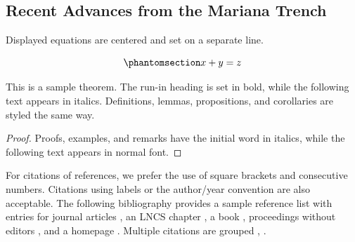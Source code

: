 \documentclass[
  runningheads]{llncs}
\begin{document}
\begin{table}[t]

\caption{\label{tbl-headings}Table captions should be placed above the
tables.}


\end{table}%

\subsection{Recent Advances from the Mariana
Trench}\label{recent-advances-from-the-mariana-trench}

Displayed equations are centered and set on a separate line.

\begin{equation}\phantomsection\label{eq-linear}{
x + y = z
}\end{equation}

\begin{theorem}
This is a sample theorem. The run-in heading is set in bold, while
the following text appears in italics. Definitions, lemmas,
propositions, and corollaries are styled the same way.
\end{theorem}

\begin{proof}
Proofs, examples, and remarks have the initial word in italics,
while the following text appears in normal font.
\end{proof}

For citations of references, we prefer the use of square brackets and
consecutive numbers. Citations using labels or the author/year
convention are also acceptable. The following bibliography provides a
sample reference list with entries for journal articles
\citep{ref_article1}, an LNCS chapter \citep{ref_lncs1}, a book
\citep{ref_book1}, proceedings without editors \citep{ref_proc1}, and a
homepage \citep{ref_url1}. Multiple citations are grouped
\citep{ref_article1, ref_lncs1, ref_book1},
\citep{ref_article1, ref_book1, ref_proc1, ref_url1}.
\end{document}
